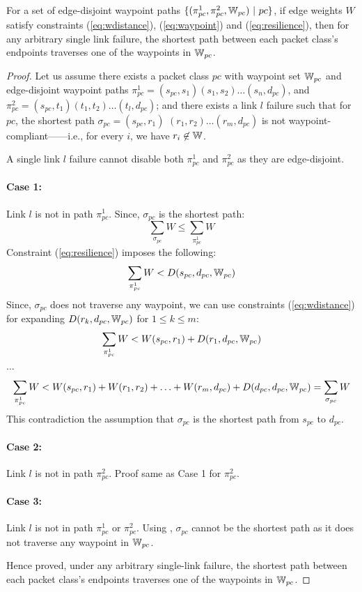 \begin{theorem}[Soundness]
	For a set of edge-disjoint waypoint paths $\{(\pi^1_{pc}, \pi^2_{pc}, \mathbb{W}_{pc}) ~|~ pc\}$, 
	if edge weights $W$ satisfy constraints (\ref{eq:wdistance}), (\ref{eq:waypoint}) and
	(\ref{eq:resilience}), 
	then for any arbitrary single link failure, 
	the shortest path between each packet class's 
	endpoints traverses one of the waypoints in $\mathbb{W}_{pc}$.
\end{theorem}
\begin{proof}
	Let us assume there exists a packet class $pc$ with waypoint set $\mathbb{W}_{pc}$ 
	and edge-disjoint waypoint paths $\pi^1_{pc} = (s_{pc}, s_1)(s_1, s_2)\ldots (s_n, d_{pc})$, 
	and $\pi^2_{pc} = (s_{pc}, t_1)(t_1, t_2)\ldots (t_l, d_{pc})$; and there exists 
	a link $l$ failure 
	such that for $pc$, the 
	shortest path $\sigma_{pc}=(s_{pc}, r_1)$ $(r_1, r_2)\ldots (r_m, d_{pc})$ 
	is not waypoint-compliant------i.e.,  
	for every $i$, we have $r_i\not\in \mathbb{W}$.
	
	A single link $l$ failure cannot disable both $\pi_{pc}^1$ and $\pi_{pc}^2$ as they are 
	edge-disjoint. 
	\paragraph{Case 1:} Link $l$ is not in path $\pi_{pc}^1$. Since, $\sigma_{pc}$ is 
	the shortest path: 
	\[
	\sum_{\sigma_{pc}}W \leq \sum_{\pi_{pc}^1}W
	\]
	Constraint (\ref{eq:resilience}) imposes the following: 
	\[
	\sum_{\pi_{pc}^1}W < D(s_{pc}, d_{pc}, \mathbb{W}_{pc}) 
	\]
	Since, $\sigma_{pc}$ does not traverse any waypoint, we can use 
	constraints (\ref{eq:wdistance}) for expanding $D(r_k, d_{pc}, \mathbb{W}_{pc})$ 
	for $1 \leq k \leq m$: 
	\[
	\sum_{\pi_{pc}^1}W < W(s_{pc}, r_1) + D(r_1, d_{pc}, \mathbb{W}_{pc}) 
	\]
	\begin{center}
	$\ldots$
	\end{center}
	\[
	\sum_{\pi_{pc}^1}W < W(s_{pc}, r_1) + W(r_1, r_2) + \ldots + W(r_m, d_{pc}) + D(d_{pc}, d_{pc}, \mathbb{W}_{pc}) = \sum_{\sigma_{pc}}W
	\]
	This contradiction the assumption that $\sigma_{pc}$ is the shortest path from $s_{pc}$ to $d_{pc}$.

	\paragraph{Case 2:} Link $l$ is not in path $\pi_{pc}^2$. Proof same as Case 1 for $\pi_{pc}^2$. 
	\paragraph{Case 3:} Link $l$ is not in path $\pi_{pc}^1$ or $\pi_{pc}^2$. Using , 
	$\sigma_{pc}$ cannot be the shortest path as it does not traverse any waypoint in $\mathbb{W}_{pc}$. 
	
	Hence proved, under any arbitrary single-link failure, the shortest path between each packet class's 
	endpoints traverses one of the waypoints in $\mathbb{W}_{pc}$.
\end{proof}

